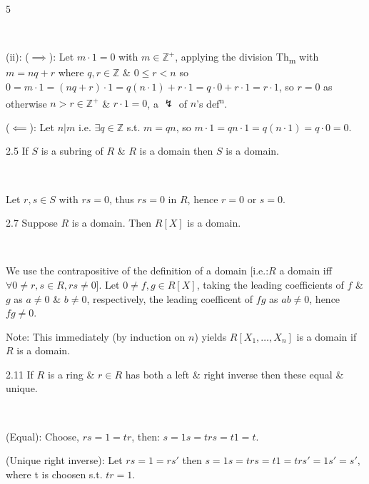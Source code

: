 \documentclass[8pt]{extarticle}
\makeatletter
\renewenvironment{proof}[1][\proofname]{%
  \pushQED{\qed}%
  \par\noindent\normalfont\itshape #1\@addpunct{.}\ \normalfont\ignorespaces
}{%
  \popQED%
  \par
}
\makeatother
\begin{document}
\begin{multicols*}{5}
\begin{proof}
            (ii): (\(\implies\)): Let \(m\cdot 1=0\) with \(m\in\mathbb{Z}^+\), applying the division Th\textsubscript{m} with \(m=nq+r\) where \(q,r\in\mathbb{Z}\) \& \(0\le r<n\) so \(0=m\cdot1=(nq+r)\cdot1=q(n\cdot1)+r\cdot1=q\cdot0+r\cdot1=r\cdot1\), so \(r=0\) as otherwise \(n>r\in\mathbb{Z}^+\) \& \(r\cdot 1=0\), a \(\lightning\) of \(n\)'s def\textsuperscript{n}.

            (\(\impliedby\)): Let \(n|m\) i.e. \(\exists q\in\mathbb{Z}\) s.t. \(m=qn\), so \(m\cdot1=qn\cdot1=q(n\cdot1)=q\cdot0=0\).
        \end{proof}


        \begin{lemma}{2.5}
            If \(S\) is a subring of \(R\) \& \(R\) is a domain then \(S\) is a domain.
        \end{lemma}

        \begin{proof}
            Let \(r,s\in S\) with \(rs=0\), thus \(rs=0\) in \(R\), hence \(r=0\) or \(s=0\).
        \end{proof}

        \begin{proposition}{2.7}
            Suppose \(R\) is a domain. Then \(R[X]\) is a domain.
        \end{proposition}

        \begin{proof}
            We use the contrapositive of the definition of a domain [i.e.:\(R\) a domain iff \(\forall 0\ne r,s\in R, rs\ne 0\)]. Let \(0\ne f,g\in R[X]\), taking the leading coefficients of \(f\) \& \(g\) as \(a\ne0\) \& \(b\ne0\), respectively, the leading coefficent of \(fg\) as \(ab\ne0\), hence \(fg\ne0\).
        \end{proof}

        {\footnotesize Note: This immediately (by induction on \(n\)) yields \(R[X_1,\ldots,X_n]\) is a domain if \(R\) is a domain.}

        \begin{lemma}{2.11}
            If \(R\) is a ring \& \(r\in R\) has both a left \& right inverse then these equal \& unique.
        \end{lemma}

        \begin{proof}
            (Equal): Choose, \(rs=1=tr\), then: \(s=1s=trs=t1=t\).

            (Unique right inverse): Let \(rs=1=rs'\) then \(s=1s=trs=t1=trs'=1s'=s'\), where t is choosen s.t. \(tr=1\).


\end{proof}
\end{multicols*}
\end{document}
